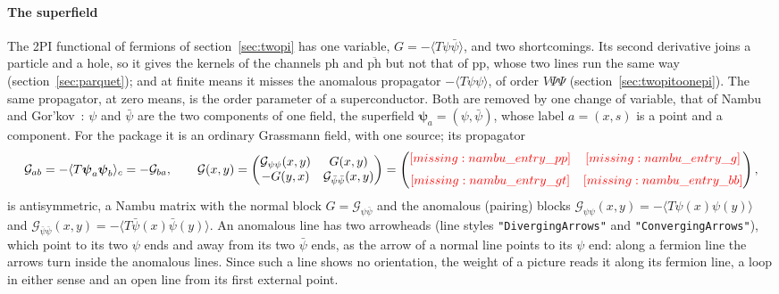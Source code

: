 \documentclass[11pt,a4paper]{article}
\newcommand{\pkg}[1]{\texttt{#1}}
\newcommand{\phbar}{\overline{\mathrm{ph}}}
\newcommand{\ph}{\mathrm{ph}}
\newcommand{\pp}{\mathrm{pp}}
\newcommand{\sfield}{\boldsymbol\psi}
\newcommand{\inputfigure}[1]{\IfFileExists{figures/#1.tex}{}{\textcolor{red}{[missing: \detokenize{#1}]}}}
\begin{document}
\paragraph{The superfield} The 2PI functional of fermions of section~\ref{sec:twopi} has one variable, $G=-\langle T\psi\bar\psi\rangle$, and two
shortcomings. Its second derivative joins a particle and a hole, so it gives the kernels of the channels $\ph$ and $\phbar$ but not
that of $\pp$, whose two lines run the same way (section~\ref{sec:parquet}); and at finite means it misses the anomalous propagator
$-\langle T\psi\psi\rangle$, of order $V\Psi\Psi$ (section~\ref{sec:twopitoonepi}). The same propagator, at zero means, is the
order parameter of a superconductor. Both are removed by one change of variable, that of Nambu and
Gor'kov~\cite{Gorkov1958,Nambu1960}: $\psi$ and $\bar\psi$ are the two components of one field, the superfield
$\sfield_a=(\psi,\bar\psi)$, whose label $a=(x,s)$ is a point and a component. For the package it is an ordinary Grassmann
field, with one source; its propagator
\[
\mathcal G_{ab}=-\langle T\sfield_a\sfield_b\rangle_c=-\mathcal G_{ba},\qquad
\mathcal G(x,y)=\begin{pmatrix}\mathcal G_{\psi\psi}(x,y)&G(x,y)\\-G(y,x)&\mathcal G_{\bar\psi\bar\psi}(x,y)\end{pmatrix}
=\begin{pmatrix}\inputfigure{nambu_entry_pp}&\inputfigure{nambu_entry_g}\\[6pt]\inputfigure{nambu_entry_gt}&\inputfigure{nambu_entry_bb}\end{pmatrix},
\]
is antisymmetric, a Nambu matrix with the normal block $G=\mathcal G_{\psi\bar\psi}$ and the anomalous (pairing) blocks
$\mathcal G_{\psi\psi}(x,y)=-\langle T\psi(x)\psi(y)\rangle$ and $\mathcal G_{\bar\psi\bar\psi}(x,y)=-\langle T\bar\psi(x)\bar\psi(y)\rangle$.
An anomalous line has two arrowheads (line styles \pkg{"DivergingArrows"} and \pkg{"ConvergingArrows"}), which point to its
two $\psi$ ends and away from its two $\bar\psi$ ends, as the arrow of a normal line points to its $\psi$ end: along a fermion
line the arrows turn inside the anomalous lines. Since such a line shows no orientation, the weight of a picture reads it
along its fermion line, a loop in either sense and an open line from its first external point.
\end{document}
